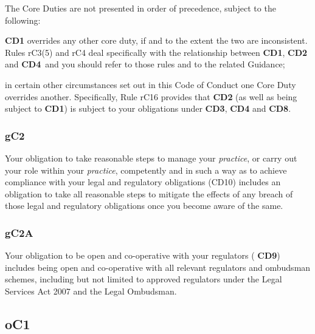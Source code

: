 The Core Duties are not presented in order of precedence, subject to the
following:
\begin{numlist}\item \textbf{\textcolor{mygold}{CD1}} overrides any other core duty, if and to the extent the two are
inconsistent. Rules rC3(5) and rC4 deal specifically with the
relationship between \textbf{\textcolor{mygold}{CD1}}, \textbf{\textcolor{mygold}{CD2}} and  \textbf{\textcolor{mygold}{CD4}}~and you should refer to those
rules and to the related Guidance;
\item in certain other circumstances set out in this Code of Conduct one
Core Duty overrides another. Specifically, Rule rC16 provides that \textbf{\textcolor{mygold}{CD2}}
(as well as being subject to \textbf{\textcolor{mygold}{CD1}}) is subject to your obligations under
 \textbf{\textcolor{mygold}{CD3}},  \textbf{\textcolor{mygold}{CD4}} and  \textbf{\textcolor{mygold}{CD8}}.
\end{numlist}

\subsubsection{\color{darkgrey}gC2}

Your obligation to take reasonable steps to manage your \emph{practice},
or carry out your role within your \emph{practice}, competently and in
such a way as to achieve compliance with your legal and regulatory
obligations (CD10) includes an obligation to take all reasonable steps
to mitigate the effects of any breach of those legal and regulatory
obligations once you become aware of the same.

\subsubsection{\color{darkgrey}gC2A}

Your obligation to be open and co-operative with your regulators ( \textbf{\textcolor{mygold}{CD9}})
includes being open and co-operative with all relevant regulators and
ombudsman schemes, including but not limited to approved regulators
under the Legal Services Act 2007 and the Legal Ombudsman.




\subsection{\color{bleu}oC1}

